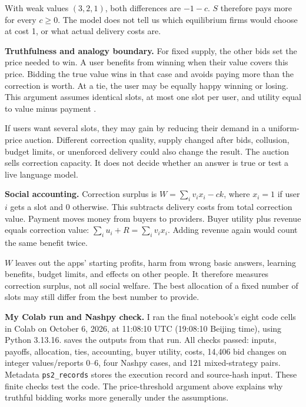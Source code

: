 With weak values $(3,2,1)$, both differences are $-1-c$. $S$ therefore pays more for every $c\geq0$. The model does not tell us which equilibrium firms would choose at cost 1, or what actual delivery costs are.

\noindent\textbf{Truthfulness and analogy boundary.}
For fixed supply, the other bids set the price needed to win. A user benefits from winning when their value covers this price. Bidding the true value wins in that case and avoids paying more than the correction is worth. At a tie, the user may be equally happy winning or losing. This argument assumes identical slots, at most one slot per user, and utility equal to value minus payment \cite{vickrey1961,roughgarden2014}.

If users want several slots, they may gain by reducing their demand in a uniform-price auction. Different correction quality, supply changed after bids, collusion, budget limits, or unenforced delivery could also change the result. The auction sells correction capacity. It does not decide whether an answer is true or test a live language model.

\noindent\textbf{Social accounting.}
Correction surplus is $W=\sum_i v_ix_i-ck$, where $x_i=1$ if user $i$ gets a slot and 0 otherwise. This subtracts delivery costs from total correction value. Payment moves money from buyers to providers. Buyer utility plus revenue equals correction value: $\sum_i u_i+R=\sum_i v_ix_i$. Adding revenue again would count the same benefit twice.

$W$ leaves out the apps' starting profits, harm from wrong basic answers, learning benefits, budget limits, and effects on other people. It therefore measures correction surplus, not all social welfare. The best allocation of a fixed number of slots may still differ from the best number to provide.

\noindent\textbf{My Colab run and Nashpy check.}
I ran the final notebook's eight code cells in Colab on October 6, 2026, at 11:08:10 UTC (19:08:10 Beijing time), using Python 3.13.16.  saves the outputs from that run. All checks passed: inputs, payoffs, allocation, ties, accounting, buyer utility, costs, 14,406 bid changes on integer values/reports 0--6, four Nashpy cases, and 121 mixed-strategy pairs. Metadata \texttt{ps2\_records} stores the execution record and source-hash input. These finite checks test the code. The price-threshold argument above explains why truthful bidding works more generally under the assumptions.

